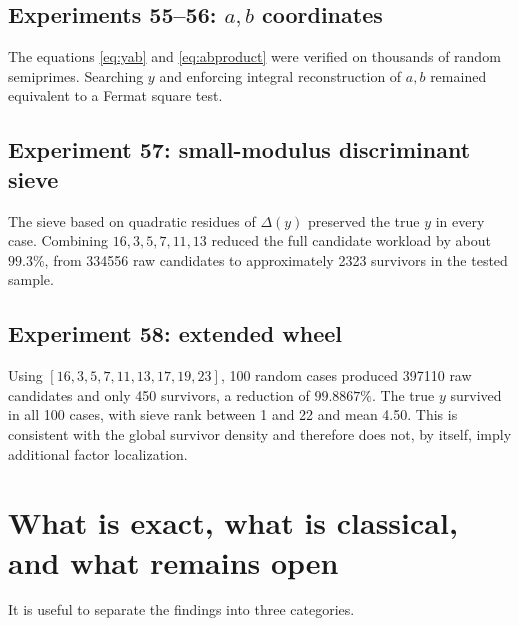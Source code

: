 \documentclass[11pt,a4paper]{article}
\begin{document}
\subsection*{Experiments 55--56: \(a,b\) coordinates}
The equations \eqref{eq:yab} and \eqref{eq:abproduct} were verified on thousands of random semiprimes. Searching \(y\) and enforcing integral reconstruction of \(a,b\) remained equivalent to a Fermat square test.

\subsection*{Experiment 57: small-modulus discriminant sieve}
The sieve based on quadratic residues of \(\Delta(y)\) preserved the true \(y\) in every case. Combining \(16,3,5,7,11,13\) reduced the full candidate workload by about \(99.3\%\), from 334556 raw candidates to approximately 2323 survivors in the tested sample.

\subsection*{Experiment 58: extended wheel}
Using \([16,3,5,7,11,13,17,19,23]\), 100 random cases produced 397110 raw candidates and only 450 survivors, a reduction of \(99.8867\%\). The true \(y\) survived in all 100 cases, with sieve rank between 1 and 22 and mean 4.50. This is consistent with the global survivor density and therefore does not, by itself, imply additional factor localization.

\section{What is exact, what is classical, and what remains open}
\label{sec:status}

It is useful to separate the findings into three categories.
\end{document}
